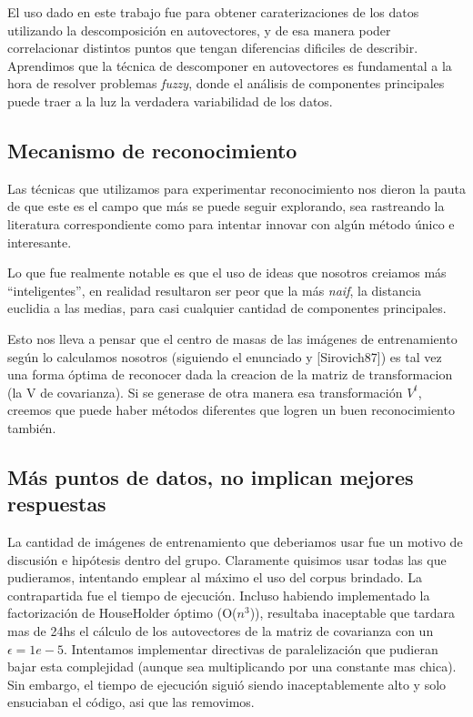 El uso dado en este trabajo fue para obtener caraterizaciones de los datos utilizando la
descomposici\'on en autovectores, y de esa manera poder correlacionar distintos puntos que
tengan diferencias dificiles de describir. Aprendimos que la t\'ecnica de descomponer en autovectores
es fundamental a la hora de resolver problemas \textit{fuzzy}, donde
el an\'alisis de componentes principales puede traer a la luz la verdadera variabilidad de los datos.


\subsection{Mecanismo de reconocimiento}

Las t\'ecnicas que utilizamos para experimentar reconocimiento nos dieron
la pauta de que este es el campo que m\'as se puede seguir explorando, sea rastreando la literatura
correspondiente como para intentar innovar con alg\'un m\'etodo \'unico e interesante.

Lo que fue realmente notable es que el uso de ideas que nosotros creiamos m\'as ``inteligentes'',
en realidad resultaron ser peor que la m\'as \textit{naif}, la distancia euclidia a las medias, para
casi cualquier cantidad de componentes principales.

Esto nos lleva a pensar que el centro de masas de las im\'agenes de entrenamiento seg\'un lo calculamos
nosotros (siguiendo el enunciado y [Sirovich87]) es tal vez una forma \'optima de reconocer
dada la creacion de la matriz de transformacion (la V de covarianza). Si se generase de otra manera esa
transformaci\'on $V^t$, creemos que puede haber m\'etodos diferentes que logren un buen reconocimiento tambi\'en.


\subsection{M\'as puntos de datos, no implican mejores respuestas}

La cantidad de im\'agenes de entrenamiento que deberiamos usar fue un motivo de
discusi\'on e hip\'otesis dentro del grupo.
Claramente quisimos usar todas las que pudieramos, intentando emplear al m\'aximo el
uso del corpus brindado. La contrapartida fue el tiempo de ejecuci\'on. Incluso habiendo implementado
la factorizaci\'on de HouseHolder \'optimo (O($n^3$)), resultaba inaceptable que tardara mas de 24hs
el c\'alculo de los autovectores de la matriz de covarianza con un $\epsilon = 1e-5$. Intentamos implementar
directivas de paralelizaci\'on que pudieran bajar esta complejidad (aunque sea multiplicando por una
constante mas chica). Sin embargo, el tiempo de ejecuci\'on sigui\'o siendo inaceptablemente alto y solo
ensuciaban el c\'odigo, asi que las removimos.

